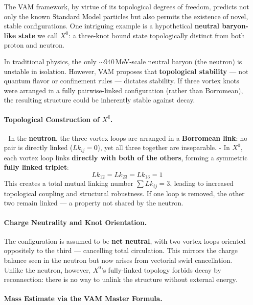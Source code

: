 The VAM framework, by virtue of its topological degrees of freedom, predicts not only the known Standard Model particles but also permits the existence of novel, stable configurations. One intriguing example is a hypothetical \textbf{neutral baryon-like state} we call $X^0$: a three-knot bound state topologically distinct from both proton and neutron.

In traditional physics, the only $\sim$940\,MeV-scale neutral baryon (the neutron) is unstable in isolation. However, VAM proposes that \textbf{topological stability} — not quantum flavor or confinement rules — dictates stability. If three vortex knots were arranged in a fully pairwise-linked configuration (rather than Borromean), the resulting structure could be inherently stable against decay.

\paragraph{Topological Construction of $X^0$.}

- In the \textbf{neutron}, the three vortex loops are arranged in a \textbf{Borromean link}: no pair is directly linked ($Lk_{ij}=0$), yet all three together are inseparable.
- In $X^0$, each vortex loop links \textbf{directly with both of the others}, forming a symmetric \textbf{fully linked triplet}:
  \[
  Lk_{12} = Lk_{23} = Lk_{13} = 1
  \]
  This creates a total mutual linking number $\sum Lk_{ij} = 3$, leading to increased topological coupling and structural robustness. If one loop is removed, the other two remain linked — a property not shared by the neutron.

\paragraph{Charge Neutrality and Knot Orientation.}

The configuration is assumed to be \textbf{net neutral}, with two vortex loops oriented oppositely to the third — cancelling total circulation. This mirrors the charge balance seen in the neutron but now arises from vectorial swirl cancellation. Unlike the neutron, however, $X^0$’s fully-linked topology forbids decay by reconnection: there is no way to unlink the structure without external energy.

\paragraph{Mass Estimate via the VAM Master Formula.}

